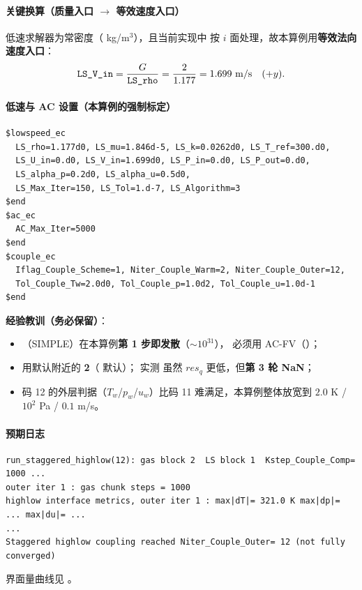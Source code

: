 \paragraph{关键换算（质量入口 $\to$ 等效速度入口）}
低速求解器为常密度（ kg/m$^3$），且当前实现中 
按 $i$ 面处理，故本算例用\textbf{等效法向速度入口}：
\begin{equation}
\code{LS\_V\_in}=\frac{G}{\code{LS\_rho}}=\frac{2}{1.177}=1.699\ \text{m/s}\quad(+y).
\end{equation}

\paragraph{低速与 AC 设置（本算例的\textbf{强制}标定）}
\begin{lstlisting}
$lowspeed_ec
  LS_rho=1.177d0, LS_mu=1.846d-5, LS_k=0.0262d0, LS_T_ref=300.d0,
  LS_U_in=0.d0, LS_V_in=1.699d0, LS_P_in=0.d0, LS_P_out=0.d0,
  LS_alpha_p=0.2d0, LS_alpha_u=0.5d0,
  LS_Max_Iter=150, LS_Tol=1.d-7, LS_Algorithm=3
$end
$ac_ec
  AC_Max_Iter=5000
$end
$couple_ec
  Iflag_Couple_Scheme=1, Niter_Couple_Warm=2, Niter_Couple_Outer=12,
  Tol_Couple_Tw=2.0d0, Tol_Couple_p=1.0d2, Tol_Couple_u=1.0d-1
$end
\end{lstlisting}
\textbf{经验教训（务必保留）}：
\begin{itemize}
  \item {}（SIMPLE）在本算例\textbf{第 1 步即发散}（$\sim10^{31}$），
        必须用 AC-FV（）；
  \item {} 用默认附近的 \textbf{2}（ 默认）；
        实测  虽然 $res_q$ 更低，但\textbf{第 3 轮 NaN}；
  \item 码 12 的外层判据（$T_w$/$p_w$/$u_w$）比码 11 难满足，本算例整体放宽到
        $2.0$ K / $10^2$ Pa / $0.1$ m/s。
\end{itemize}

\paragraph{预期日志}
\begin{lstlisting}
run_staggered_highlow(12): gas block 2  LS block 1  Kstep_Couple_Comp= 1000 ...
outer iter 1 : gas chunk steps = 1000
highlow interface metrics, outer iter 1 : max|dT|= 321.0 K max|dp|= ... max|du|= ...
...
Staggered highlow coupling reached Niter_Couple_Outer= 12 (not fully converged)
\end{lstlisting}
界面量曲线见 。

